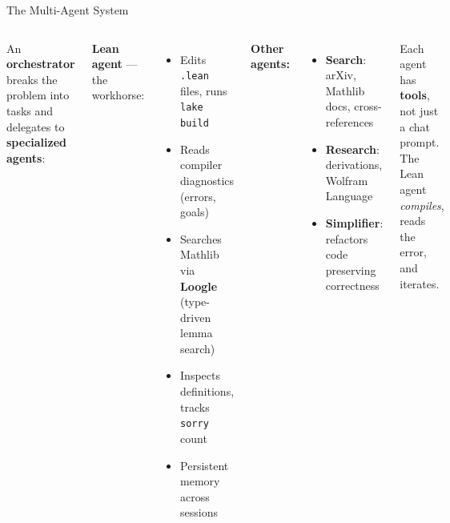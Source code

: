 \documentclass[aspectratio=169,10pt]{beamer}
\begin{document}
\begin{frame}{The Multi-Agent System}
    \vspace{-0.3em}

    \begin{columns}[T]
        \small
        An \textbf{orchestrator} breaks the problem into tasks
        and delegates to \textbf{specialized agents}:

        \vspace{0.3em}
        \textbf{\textcolor{leangreen}{Lean agent}} --- the workhorse:
        \begin{itemize}\itemsep0.05em\scriptsize
            \item Edits \texttt{.lean} files, runs \texttt{lake build}
            \item Reads compiler diagnostics (errors, goals)
            \item Searches Mathlib via \textbf{Loogle} (type-driven lemma search)
            \item Inspects definitions, tracks \texttt{sorry} count
            \item Persistent memory across sessions
        \end{itemize}

        \vspace{0.2em}
        \textbf{\textcolor{leanblue}{Other agents:}}
        \begin{itemize}\itemsep0.05em\scriptsize
            \item \textbf{Search}: arXiv, Mathlib docs, cross-references
            \item \textbf{Research}: derivations, Wolfram Language
            \item \textbf{Simplifier}: refactors code preserving correctness
        \end{itemize}

        \vspace{0.2em}
        {\small Each agent has \textbf{tools}, not just a chat prompt.
        The Lean agent \emph{compiles}, reads the error, and iterates.}

        \begin{center}
\end{center}
\end{columns}
\end{frame}
\end{document}
